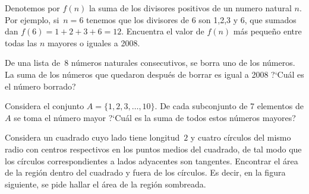 \begin{Problema}{3}
  Denotemos por $f(n)$ la suma de los divisores positivos de un numero
  natural $n$. Por ejemplo, si~$n=6$ tenemos que los divisores de 6
  son 1,2,3 y 6, que sumados dan $f(6)=1+2+3+6=12$. Encuentra el valor
  de $f(n)$ m\'as peque\~no entre todas las $n$ mayores o iguales a 2008.
\end{Problema}

\begin{Solucion}
  
\end{Solucion}

\begin{Problema}{4}
  De una lista de~8 n\'umeros naturales consecutivos, se borra uno de
  los n\'umeros. La suma de los n\'umeros que quedaron despu\'es de
  borrar es igual a 2008 ?`Cu\'al es el n\'umero borrado?
\end{Problema}

\begin{Solucion}
  
\end{Solucion}

\begin{Problema}{5}
  Considera el conjunto $A=\{1,2,3,\ldots,10\}$.  De cada subconjunto
  de 7 elementos de $A$ se toma el n\'umero mayor ?`Cu\'al es la suma
  de todos estos n\'umeros mayores?
\end{Problema}

\begin{Solucion}
  
\end{Solucion}

\begin{Problema}{6}
  Considera un cuadrado cuyo lado tiene longitud~$2$ y cuatro
  c\'irculos del mismo radio con centros respectivos en los puntos
  medios del cuadrado, de tal modo que los c\'irculos correspondientes
  a lados adyacentes son tangentes.  Encontrar el \'area de la
  regi\'on dentro del cuadrado y fuera de los c\'irculos. Es decir, en
  la figura siguiente, se pide hallar el \'area de la regi\'on
  sombreada.

  \begin{center}

  \end{center}
\end{Problema}


